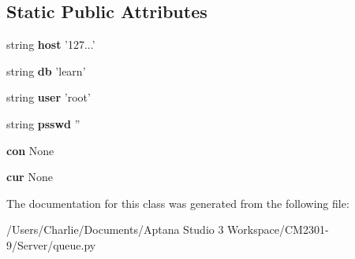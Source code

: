 \subsection*{Static Public Attributes}
\begin{DoxyCompactItemize}
\item 
\hypertarget{classqueue_1_1_database_aff978a63409c521617345134d1b570f2}{string {\bfseries host} '127...'}\label{classqueue_1_1_database_aff978a63409c521617345134d1b570f2}

\item 
\hypertarget{classqueue_1_1_database_a072fe6e42f893a197f16e5c6f3ca36d1}{string {\bfseries db} 'learn'}\label{classqueue_1_1_database_a072fe6e42f893a197f16e5c6f3ca36d1}

\item 
\hypertarget{classqueue_1_1_database_a5badc9d8c7bca15491073780b925a1b2}{string {\bfseries user} 'root'}\label{classqueue_1_1_database_a5badc9d8c7bca15491073780b925a1b2}

\item 
\hypertarget{classqueue_1_1_database_a0e936716a70aaddad972b9da66b7c1e9}{string {\bfseries psswd} ''}\label{classqueue_1_1_database_a0e936716a70aaddad972b9da66b7c1e9}

\item 
\hypertarget{classqueue_1_1_database_acbddd4806c9d47ec354cac2db47f8579}{{\bfseries con} None}\label{classqueue_1_1_database_acbddd4806c9d47ec354cac2db47f8579}

\item 
\hypertarget{classqueue_1_1_database_a3a5f44152f575fc32e7395ad1c6934a2}{{\bfseries cur} None}\label{classqueue_1_1_database_a3a5f44152f575fc32e7395ad1c6934a2}

\end{DoxyCompactItemize}


The documentation for this class was generated from the following file\-:\begin{DoxyCompactItemize}
\item 
/\-Users/\-Charlie/\-Documents/\-Aptana Studio 3 Workspace/\-C\-M2301-\/9/\-Server/queue.\-py\end{DoxyCompactItemize}
